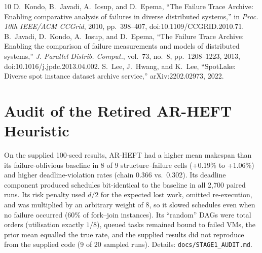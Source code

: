 \documentclass[10pt,twocolumn,letterpaper]{article}
\begin{document}
\begin{thebibliography}{10}
 D.~Kondo, B.~Javadi, A.~Iosup, and D.~Epema, ``The Failure Trace Archive: Enabling comparative analysis of failures in diverse distributed systems,'' in \emph{Proc. 10th IEEE/ACM CCGrid}, 2010, pp.~398--407, doi:10.1109/CCGRID.2010.71.
 B.~Javadi, D.~Kondo, A.~Iosup, and D.~Epema, ``The Failure Trace Archive: Enabling the comparison of failure measurements and models of distributed systems,'' \emph{J. Parallel Distrib. Comput.}, vol.~73, no.~8, pp.~1208--1223, 2013, doi:10.1016/j.jpdc.2013.04.002.
 S.~Lee, J.~Hwang, and K.~Lee, ``SpotLake: Diverse spot instance dataset archive service,'' arXiv:2202.02973, 2022.
\end{thebibliography}

\appendix
\section{Audit of the Retired AR-HEFT Heuristic}\label{app:audit}
On the supplied 100-seed results, AR-HEFT had a higher mean makespan than its failure-oblivious baseline in 8 of 9
structure--failure cells (+0.19\% to +1.06\%) and higher deadline-violation rates (chain 0.366 vs.\ 0.302). Its deadline
component produced schedules bit-identical to the baseline in all 2,700 paired runs. Its risk penalty used $d/2$ for the
expected lost work, omitted re-execution, and was multiplied by an arbitrary weight of 8, so it slowed schedules even
when no failure occurred (60\% of fork--join instances). Its ``random'' DAGs were total orders (utilisation exactly $1/8$),
queued tasks remained bound to failed VMs, the prior mean equalled the true rate, and the supplied results did not reproduce
from the supplied code (9 of 20 sampled runs). Details: \texttt{docs/STAGE1\_AUDIT.md}.
\end{document}
